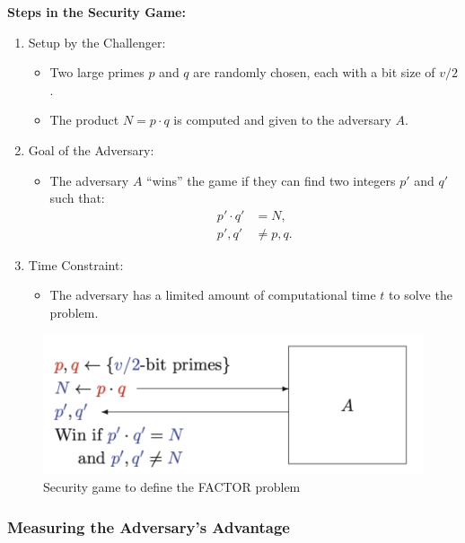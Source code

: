 \textbf{Steps in the Security Game:}

\begin{enumerate}
    \item Setup by the Challenger:
    \begin{itemize}
        \item Two large primes \(p\) and \(q\) are randomly chosen, each with a bit size of \(v/2\).
        \item The product \(N = p \cdot q\) is computed and given to the adversary \(A\).
    \end{itemize}
    
    \item Goal of the Adversary:
    \begin{itemize}
        \item The adversary \(A\) ``wins'' the game if they can find two integers \(p'\) and \(q'\) such that:
        \begin{align*}
            p' \cdot q' &= N, \\
            p', q' &\neq p, q.
        \end{align*}
    \end{itemize}

    \item Time Constraint:
    \begin{itemize}
        \item The adversary has a limited amount of computational time \(t\) to solve the problem.
    \end{itemize}
\end{enumerate}

\begin{figure}[h!]
    \centering
    \includegraphics[scale=0.5]{img/game-factor.png}
    \caption{Security game to define the FACTOR problem}
\end{figure}

\subsubsection{Measuring the Adversary's Advantage}

